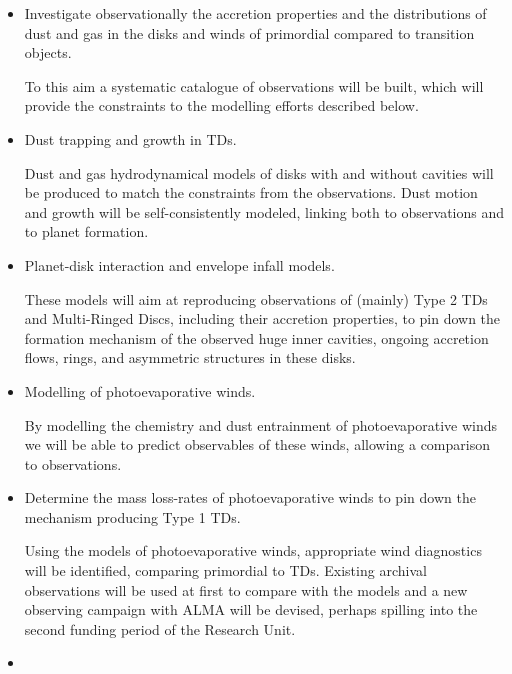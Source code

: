\documentclass[10pt,fleqn,twoside]{article}
\begin{document}
\begin{itemize}
\item
\begin{Emphasize}
  Investigate observationally the accretion properties and the distributions
  of dust and gas in the disks and winds of primordial compared to
  transition objects.
\end{Emphasize}
To this aim a systematic catalogue of observations will be built, 
which will provide the constraints to the modelling efforts described below. 
\item
\begin{Emphasize}
  Dust trapping and growth in TDs.
\end{Emphasize}
Dust and
gas hydrodynamical models of disks with and without cavities will be produced to match the
constraints from the observations. Dust motion and growth will be self-consistently
modeled, linking both to observations and to planet formation.  
\item
\begin{Emphasize}
  Planet-disk interaction and envelope infall models.
\end{Emphasize}
These models will aim at reproducing
observations of (mainly) Type 2 TDs and Multi-Ringed Discs, 
including their accretion properties, 
to pin down the formation mechanism of the observed huge inner cavities,
ongoing accretion flows, rings, and asymmetric structures in these disks.
\item
\begin{Emphasize}
  Modelling of photoevaporative winds.
\end{Emphasize}
By modelling the chemistry and dust entrainment of photoevaporative winds
we will be able to predict observables of these winds, allowing a comparison
to observations.
\item
\begin{Emphasize}
  Determine the mass loss-rates of photoevaporative winds to pin down the
  mechanism producing Type 1 TDs.
\end{Emphasize}
Using the models of photoevaporative winds, appropriate wind diagnostics 
will be identified, comparing primordial to
TDs. Existing archival observations will be used at first to compare
with the models and a new observing campaign with ALMA will be
devised, perhaps spilling into the second funding period of the Research Unit.
\item
\begin{Emphasize}

\end{Emphasize}
\end{itemize}
\end{document}
